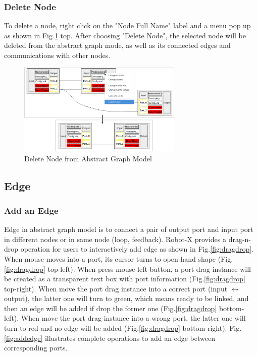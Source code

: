 \documentclass[a4paper,10pt]{book}
\begin{document}
\subsubsection{Delete Node}

To delete a node, right click on the "Node Full Name" label and a menu pop up as shown in Fig.\ref{fig:deletenode} top. After choosing "Delete Node", the selected node will be deleted from the abstract graph mode, as well as its connected edges and communications with other nodes.

\begin{figure}
 \centering
 \includegraphics[width=0.7\textwidth]{img/deletenode.eps}
 \caption{Delete Node from Abstract Graph Model}
 \label{fig:deletenode}
\end{figure}

\subsection{Edge}

\subsubsection{Add an Edge}

Edge in abstract graph model is to connect a pair of output port and input port in different nodes or in same node (loop, feedback). Robot-X provides a drag-n-drop operation for users to interactively add edge as shown in Fig.\ref{fig:dragdrop}. When mouse moves into a port, its cursor turns to open-hand shape (Fig.\ref{fig:dragdrop} top-left). When press mouse left button, a port drag instance will be created as a transparent text box with port information (Fig.\ref{fig:dragdrop} top-right). When move the port drag instance into a correct port (input $\leftrightarrow$ output), the latter one will turn to green, which means ready to be linked, and then an edge will be added if drop the former one (Fig.\ref{fig:dragdrop} bottom-left). When move the port drag instance into a wrong port, the latter one will turn to red and no edge will be added (Fig.\ref{fig:dragdrop} bottom-right). Fig.\ref{fig:addedge} illustrates complete operations to add an edge between corresponding ports. 
\end{document}
